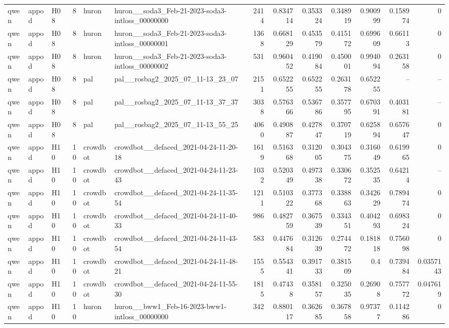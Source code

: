 \begin{longtable}{lllrllrrrrrrr}
qwen & appod & H08 & 8 & huron & huron\_\_soda3\_Feb-21-2023-soda3-intloss\_00000000 & 2414 & 0.834714 & 0.353324 & 0.348919 & 0.900999 & 0.158974 & 0 \\
qwen & appod & H08 & 8 & huron & huron\_\_soda3\_Feb-21-2023-soda3-intloss\_00000001 & 1368 & 0.668129 & 0.453579 & 0.415172 & 0.699609 & 0.66113 & 0 \\
qwen & appod & H08 & 8 & huron & huron\_\_soda3\_Feb-21-2023-soda3-intloss\_00000002 & 531 & 0.960452 & 0.419084 & 0.450001 & 0.994094 & 0.263158 & 0 \\
qwen & appod & H08 & 8 & pal & pal\_\_rosbag2\_2025\_07\_11-13\_23\_07 & 2151 & 0.652255 & 0.652255 & 0.263178 & 0.652255 & -- & -- \\
qwen & appod & H08 & 8 & pal & pal\_\_rosbag2\_2025\_07\_11-13\_37\_37 & 3038 & 0.576366 & 0.536786 & 0.357795 & 0.670391 & 0.403181 & -- \\
qwen & appod & H08 & 8 & pal & pal\_\_rosbag2\_2025\_07\_11-13\_55\_25 & 4060 & 0.490887 & 0.427847 & 0.370719 & 0.625894 & 0.657647 & 0 \\
qwen & appod & H10 & 10 & crowdbot & crowdbot\_\_defaced\_2021-04-24-11-20-18 & 1619 & 0.516368 & 0.312005 & 0.304375 & 0.316049 & 0.619965 & 0 \\
qwen & appod & H10 & 10 & crowdbot & crowdbot\_\_defaced\_2021-04-24-11-23-43 & 1032 & 0.520349 & 0.497338 & 0.330672 & 0.352535 & 0.64214 & -- \\
qwen & appod & H10 & 10 & crowdbot & crowdbot\_\_defaced\_2021-04-24-11-35-54 & 1211 & 0.510322 & 0.377368 & 0.338863 & 0.342629 & 0.789474 & 0 \\
qwen & appod & H10 & 10 & crowdbot & crowdbot\_\_defaced\_2021-04-24-11-40-33 & 986 & 0.482759 & 0.367539 & 0.334351 & 0.404293 & 0.698324 & 0 \\
qwen & appod & H10 & 10 & crowdbot & crowdbot\_\_defaced\_2021-04-24-11-43-54 & 583 & 0.447684 & 0.312639 & 0.274472 & 0.181818 & 0.756098 & 0 \\
qwen & appod & H10 & 10 & crowdbot & crowdbot\_\_defaced\_2021-04-24-11-48-21 & 1555 & 0.554341 & 0.391733 & 0.381509 & 0.4 & 0.739484 & 0.0357143 \\
qwen & appod & H10 & 10 & crowdbot & crowdbot\_\_defaced\_2021-04-24-11-55-30 & 1815 & 0.47438 & 0.358157 & 0.325035 & 0.26908 & 0.757772 & 0.047619 \\
qwen & appod & H10 & 10 & huron & huron\_\_bww1\_Feb-16-2023-bww1-intloss\_00000000 & 342 & 0.880117 & 0.362685 & 0.367858 & 0.97377 & 0.114286 & 0 \\

\end{longtable}
